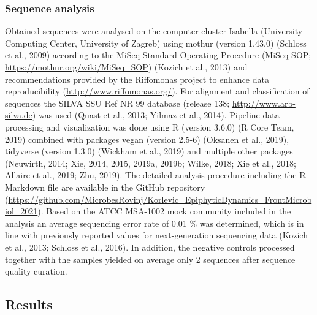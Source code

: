 \documentclass[
  12pt,
]{article}
\begin{document}
\hypertarget{sequence-analysis}{%
\subsubsection{Sequence analysis}\label{sequence-analysis}}

Obtained sequences were analysed on the computer cluster Isabella
(University Computing Center, University of Zagreb) using mothur
(version 1.43.0) (Schloss et al., 2009) according to the MiSeq Standard
Operating Procedure (MiSeq SOP; \url{https://mothur.org/wiki/MiSeq_SOP})
(Kozich et al., 2013) and recommendations provided by the Riffomonas
project to enhance data reproducibility
(\url{http://www.riffomonas.org/}). For alignment and classification of
sequences the SILVA SSU Ref NR 99 database (release 138;
\url{http://www.arb-silva.de}) was used (Quast et al., 2013; Yilmaz et
al., 2014). Pipeline data processing and visualization was done using R
(version 3.6.0) (R Core Team, 2019) combined with packages vegan
(version 2.5-6) (Oksanen et al., 2019), tidyverse (version 1.3.0)
(Wickham et al., 2019) and multiple other packages (Neuwirth, 2014; Xie,
2014, 2015, 2019a, 2019b; Wilke, 2018; Xie et al., 2018; Allaire et al.,
2019; Zhu, 2019). The detailed analysis procedure including the R
Markdown file are available in the GitHub repository
(\url{https://github.com/MicrobesRovinj/Korlevic_EpiphyticDynamics_FrontMicrobiol_2021}).
Based on the ATCC MSA-1002 mock community included in the analysis an
average sequencing error rate of 0.01 \si{\percent} was determined,
which is in line with previously reported values for next-generation
sequencing data (Kozich et al., 2013; Schloss et al., 2016). In
addition, the negative controls processed together with the samples
yielded on average only 2 sequences after sequence quality curation.

\newpage

\hypertarget{results}{%
\subsection{Results}\label{results}}
\end{document}
